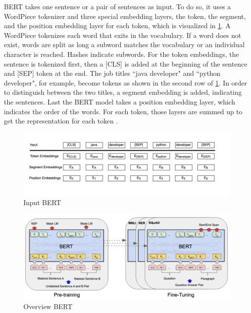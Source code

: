 \documentclass[12pt, a4paper, titlepage]{article}
\begin{document}
\ac{BERT} takes one sentence or a pair of sentences as input. To do so, it uses a WordPiece tokenizer and three special embedding layers, the token, the segment, and the position embedding layer for each token, which is visualized in \ref{fig: F4}. A WordPiece tokenizes each word that exits in the vocabulary. If a word does not exist, words are split as long a subword matches the vocabulary or an individual character is reached. Hashes indicate subwords. For the token embeddings, the sentence is tokenized first, then a [CLS] is added at the beginning of the sentence and [SEP] token at the end. The job titles ``java developer" and ``python developer", for example, become tokens as shown in the second row of \ref{fig: F4}. In order to distinguish between the two titles, a segment embedding is added, indicating the sentences. Last the \ac{BERT} model takes a position embedding layer, which indicates the order of the words. For each token, those layers are summed up to get the representation for each token \citep{devlin2018,ravichandiran2021}.

\begin{figure}[hb!]
  \center
  \includegraphics[scale=0.5]{BERTInput_own.png}
  \caption{\label{fig: F4} Input \ac{BERT} \citep[5]{devlin2018}}
\end{figure}

\begin{figure}[hb!]
  \center
  \includegraphics[scale=0.5]{BERTOverview.png}
  \caption{\label{fig: F3} Overview \ac{BERT} \citep[3]{devlin2018}}
\end{figure}
\end{document}
